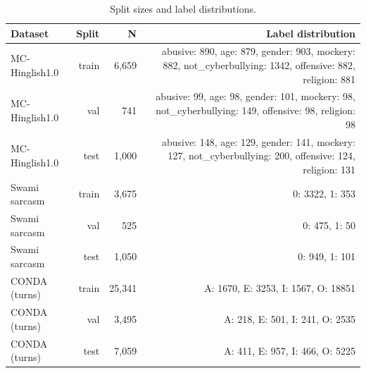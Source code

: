 \begin{table}[t]
\centering
\small
\caption{Split sizes and label distributions.}
\label{tab:tab02_splits}
\begin{tabular}{lrrr}
\toprule
Dataset & Split & N & Label distribution \\
\midrule
MC-Hinglish1.0 & train & 6,659 & abusive: 890, age: 879, gender: 903, mockery: 882, not\_cyberbullying: 1342, offensive: 882, religion: 881 \\
MC-Hinglish1.0 & val & 741 & abusive: 99, age: 98, gender: 101, mockery: 98, not\_cyberbullying: 149, offensive: 98, religion: 98 \\
MC-Hinglish1.0 & test & 1,000 & abusive: 148, age: 129, gender: 141, mockery: 127, not\_cyberbullying: 200, offensive: 124, religion: 131 \\
Swami sarcasm & train & 3,675 & 0: 3322, 1: 353 \\
Swami sarcasm & val & 525 & 0: 475, 1: 50 \\
Swami sarcasm & test & 1,050 & 0: 949, 1: 101 \\
CONDA (turns) & train & 25,341 & A: 1670, E: 3253, I: 1567, O: 18851 \\
CONDA (turns) & val & 3,495 & A: 218, E: 501, I: 241, O: 2535 \\
CONDA (turns) & test & 7,059 & A: 411, E: 957, I: 466, O: 5225 \\
\bottomrule
\end{tabular}
\end{table}
